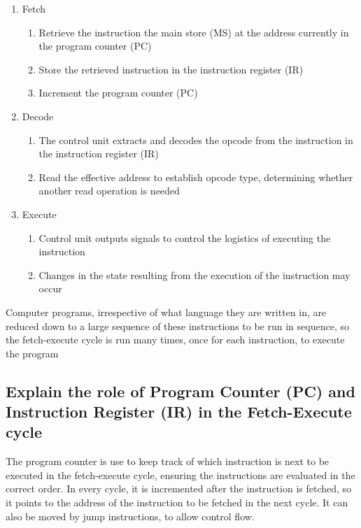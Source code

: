 \documentclass{article}
\begin{document}
\begin{enumerate}
\item
  Fetch
  \begin{enumerate}
  \item
    Retrieve the instruction the main store (MS) at the address
    currently in the program counter (PC)
  \item
    Store the retrieved instruction in the instruction register (IR)
  \item
    Increment the program counter (PC)
  \end{enumerate}
\item
  Decode
  \begin{enumerate}
  \item
    The control unit extracts and decodes the opcode from the
    instruction in the instruction register (IR)
  \item
    Read the effective address to establish opcode type, determining
    whether another read operation is needed
  \end{enumerate}
\item
  Execute
  \begin{enumerate}
  \item
    Control unit outputs signals to control the logistics of executing
    the instruction
  \item
    Changes in the state resulting from the execution of the instruction
    may occur
  \end{enumerate}
\end{enumerate}

Computer programs, irrespective of what language they are written in,
are reduced down to a large sequence of these instructions to be run in
sequence, so the fetch-execute cycle is run many times, once for each
instruction, to execute the program



\subsection{Explain the role of Program Counter (PC) and Instruction
Register (IR) in the Fetch-Execute cycle}

The program counter is use to keep track of which instruction is next to
be executed in the fetch-execute cycle, ensuring the instructions are
evaluated in the correct order. In every cycle, it is incremented after
the instruction is fetched, so it points to the address of the
instruction to be fetched in the next cycle. It can also be moved by
jump instructions, to allow control flow.
\end{document}
